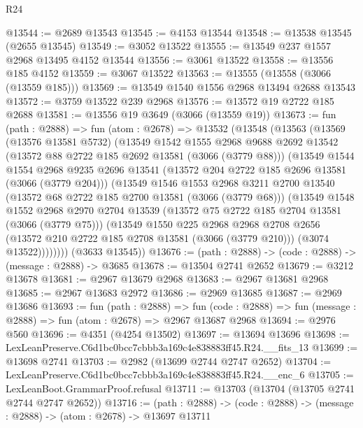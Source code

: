 \begin{lexlean}{R24}
\begin{coremodule}
@13544 := @2689 @13543
@13545 := @4153 @13544
@13548 := @13538 @13545 (@2655 @13545)
@13549 := @3052 @13522
@13555 := @13549 @237 @1557 @2968 @13495 @4152 @13544
@13556 := @3061 @13522
@13558 := @13556 @185 @4152
@13559 := @3067 @13522
@13563 := @13555 (@13558 (@3066 (@13559 @185)))
@13569 := @13549 @1540 @1556 @2968 @13494 @2688 @13543
@13572 := @3759 @13522 @239 @2968
@13576 := @13572 @19 @2722 @185 @2688
@13581 := @13556 @19 @3649 (@3066 (@13559 @19))
@13673 := fun (path : @2888) =>
  fun (atom : @2678) =>
  @13532
    (@13548
      (@13563
        (@13569
          (@13576 @13581 @5732)
          (@13549
            @1542
            @1555
            @2968
            @9688
            @2692
            @13542
            (@13572 @88 @2722 @185 @2692 @13581 (@3066 (@3779 @88)))
            (@13549
              @1544
              @1554
              @2968
              @9235
              @2696
              @13541
              (@13572 @204 @2722 @185 @2696 @13581 (@3066 (@3779 @204)))
              (@13549
                @1546
                @1553
                @2968
                @3211
                @2700
                @13540
                (@13572 @68 @2722 @185 @2700 @13581 (@3066 (@3779 @68)))
                (@13549
                  @1548
                  @1552
                  @2968
                  @2970
                  @2704
                  @13539
                  (@13572 @75 @2722 @185 @2704 @13581 (@3066 (@3779 @75)))
                  (@13549
                    @1550
                    @225
                    @2968
                    @2968
                    @2708
                    @2656
                    (@13572 @210 @2722 @185 @2708 @13581 (@3066 (@3779 @210)))
                    (@3074 @13522))))))))
      (@3633 @13545))
@13676 := (path : @2888) -> (code : @2888) -> (message : @2888) -> @3685
@13678 := @13504 @2741 @2652
@13679 := @3212 @13678
@13681 := @2967 @13679 @2968
@13683 := @2967 @13681 @2968
@13685 := @2967 @13683 @2972
@13686 := @2969 @13685
@13687 := @2969 @13686
@13693 := fun (path : @2888) =>
  fun (code : @2888) => fun (message : @2888) => fun (atom : @2678) => @2967 @13687 @2968
@13694 := @2976 @560
@13696 := @4351 (@4254 @13502)
@13697 := @13694 @13696
@13698 := LexLeanPreserve.C6d1bc0bcc7cbbb3a169c4e838883ff45.R24.__fits_13
@13699 := @13698 @2741
@13703 := @2982 (@13699 @2744 @2747 @2652)
@13704 := LexLeanPreserve.C6d1bc0bcc7cbbb3a169c4e838883ff45.R24.__enc_6
@13705 := LexLeanBoot.GrammarProof.refusal
@13711 := @13703 (@13704 (@13705 @2741 @2744 @2747 @2652))
@13716 := (path : @2888) -> (code : @2888) -> (message : @2888) -> (atom : @2678) -> @13697 @13711

\end{coremodule}
\end{lexlean}
